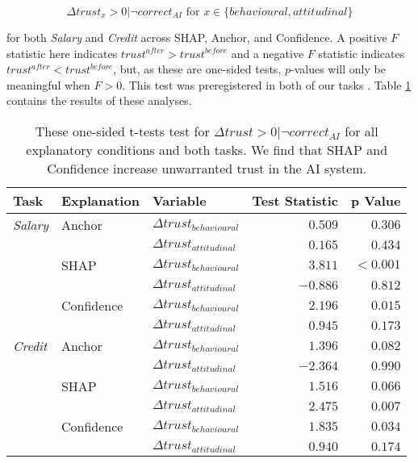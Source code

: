 \begin{equation}
    \Delta trust_{x} > 0 | \neg correct_{AI} \text{ for } x \in \{behavioural, attitudinal\}
\end{equation}

\noindent for both \emph{Salary} and \emph{Credit} across SHAP, Anchor, and Confidence. A positive $F$ statistic here indicates $trust^{after} > trust^{before}$ and a negative $F$ statistic indicates $trust^{after} < trust^{before}$, but, as these are one-sided tests, $p$-values will only be meaningful when $F > 0$. This test was preregistered in both of our tasks \cite{natarajan_binns_2022}. Table \ref{tab:delta-trust-t} contains the results of these analyses.  

\begin{table}[htb]
    \centering
    \caption{These one-sided t-tests test for $\Delta trust > 0 | \neg correct_{AI}$ for all explanatory conditions and both tasks. We find that SHAP and Confidence increase unwarranted trust in the AI system.}
    \label{tab:delta-trust-t}
    \begin{tabular}{l l l r r}
        \toprule
        Task & Explanation & Variable & Test Statistic & p Value \\ 
        \midrule
        \emph{Salary} & Anchor & $\Delta trust_{behavioural}$ & $0.509$ & $0.306$ \\
        & & $\Delta trust_{attitudinal}$ & $0.165$ & $0.434$ \\
        & SHAP & $\Delta trust_{behavioural}$ & $\mathbf{3.811}$ & $\mathbf{<0.001}$ \\
        & & $\Delta trust_{attitudinal}$ & $-0.886$ & $0.812$ \\
        & Confidence & $\Delta trust_{behavioural}$ & $\mathbf{2.196}$ & $\mathbf{0.015}$ \\
        & & $\Delta trust_{attitudinal}$ & $0.945$ & $0.173$ \\
        \midrule
        \emph{Credit} & Anchor & $\Delta trust_{behavioural}$ & $1.396$ & $0.082$ \\
        & & $\Delta trust_{attitudinal}$ & $-2.364$ & $0.990$ \\
        & SHAP & $\Delta trust_{behavioural}$ & $1.516$ & $0.066$ \\
        & & $\Delta trust_{attitudinal}$ & $\mathbf{2.475}$ & $\mathbf{0.007}$ \\
        & Confidence & $\Delta trust_{behavioural}$ & $\mathbf{1.835}$ & $\mathbf{0.034}$ \\
        & & $\Delta trust_{attitudinal}$ & $0.940$ & $0.174$ \\
        \bottomrule
    \end{tabular}
\end{table}

